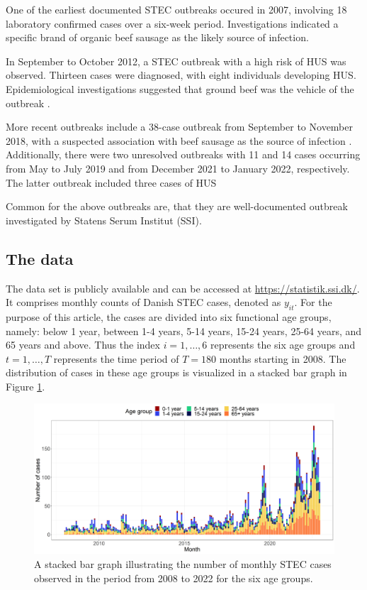 \documentclass[preprint, 3p, authoryear]{elsarticle} %
\begin{document}
One of the earliest documented STEC outbreaks occured in 2007, involving 18 laboratory confirmed cases over a six-week period. Investigations indicated a specific brand of organic beef sausage as the likely source of infection.

In September to October 2012, a STEC outbreak with a high risk of HUS was observed. Thirteen cases were diagnosed, with eight individuals developing HUS. Epidemiological investigations suggested that ground beef was the vehicle of the outbreak \citep[\citet{Helwigh_2013}]{Soborg_2013}.

More recent outbreaks include a 38-case outbreak from September to November 2018, with a suspected association with beef sausage as the source of infection \citep{Helwigh_2019}. Additionally, there were two unresolved outbreaks with 11 and 14 cases occurring from May to July 2019 and from December 2021 to January 2022, respectively. The latter outbreak included three cases of HUS

Common for the above outbreaks are, that they are well-documented outbreak investigated by Statens Serum Institut (SSI).

\hypertarget{the-data}{%
\subsection{The data}\label{the-data}}

The data set is publicly available and can be accessed at \url{https://statistik.ssi.dk/}. It comprises monthly counts of Danish STEC cases, denoted as \(y_{it}\). For the purpose of this article, the cases are divided into six functional age groups, namely: below 1 year, between 1-4 years, 5-14 years, 15-24 years, 25-64 years, and 65 years and above. Thus the index \(i=1,\dots,6\) represents the six age groups and \(t=1,\dots,T\) represents the time period of \(T=180\) months starting in 2008. The distribution of cases in these age groups is visualized in a stacked bar graph in Figure \ref{fig:STEC}.



\begin{figure}[H]
\includegraphics[width=1\linewidth]{../../figures/STEC_long_plot} \caption{A stacked bar graph illustrating the number of monthly STEC cases observed in the period from 2008 to 2022 for the six age groups.}\label{fig:STEC}
\end{figure}
\end{document}
